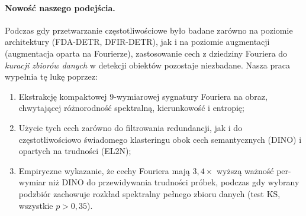 \paragraph{Nowość naszego podejścia.}
Podczas gdy przetwarzanie częstotliwościowe było badane zarówno na poziomie
architektury (FDA-DETR, DFIR-DETR), jak i na poziomie augmentacji
(augmentacja oparta na Fourierze), zastosowanie cech z dziedziny Fouriera
do \emph{kuracji zbiorów danych} w detekcji obiektów pozostaje niezbadane.
Nasza praca wypełnia tę lukę poprzez:
\begin{enumerate}
    \item Ekstrakcję kompaktowej 9-wymiarowej sygnatury Fouriera na obraz,
          chwytającej różnorodność spektralną, kierunkowość i entropię;
    \item Użycie tych cech zarówno do filtrowania redundancji, jak i do
          częstotliwościowo świadomego klasteringu obok cech semantycznych
          (DINO) i opartych na trudności (EL2N);
    \item Empiryczne wykazanie, że cechy Fouriera mają $3{,}4\times$ wyższą
          ważność per-wymiar niż DINO do przewidywania trudności próbek,
          podczas gdy wybrany podzbiór zachowuje rozkład spektralny pełnego
          zbioru danych (test KS, wszystkie $p > 0{,}35$).
\end{enumerate}


